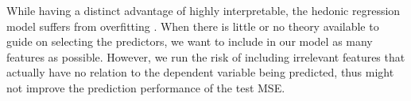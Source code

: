 While having a distinct advantage of highly interpretable, the hedonic
regression model suffers from overfitting \parencite{harrell2015regression}.
When there is little or no theory available to guide on selecting the
predictors, we want to include in our model as many features as possible.
However, we run the risk of including irrelevant features that actually have no
relation to the dependent variable being predicted, thus might not improve the
prediction performance of the test MSE.




